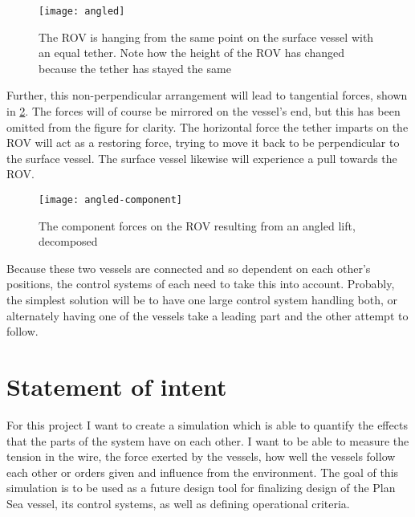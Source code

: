 \begin{figure}
	\centering
	\texttt{[image: angled]}
	\caption{The ROV is hanging from the same point on the surface vessel with an equal tether. Note how the height of the ROV has changed because the tether has stayed the same}
	\label{fig:angled}
\end{figure}

Further, this non-perpendicular arrangement will lead to tangential forces, shown in \cref{fig:angled-force}. The forces will of course be mirrored on the vessel's end, but this has been omitted from the figure for clarity. The horizontal force the tether imparts on the ROV will act as a restoring force, trying to move it back to be perpendicular to the surface vessel. The surface vessel likewise will experience a pull towards the ROV. 

\begin{figure}
	\centering
	\texttt{[image: angled-component]}
	\caption{The component forces on the ROV resulting from an angled lift, decomposed}
	\label{fig:angled-force}
\end{figure}

Because these two vessels are connected and so dependent on each other's positions, the control systems of each need to take this into account. Probably, the simplest solution will be to have one large control system handling both, or alternately having one of the vessels take a leading part and the other attempt to follow.  

\section{Statement of intent}
For this project I want to create a simulation which is able to quantify the effects that the parts of the system have on each other. I want to be able to measure the tension in the wire, the force exerted by the vessels, how well the vessels follow each other or orders given and influence from the environment. The goal of this simulation is to be used as a future design tool for finalizing design of the Plan Sea vessel, its control systems, as well as defining operational criteria. 
